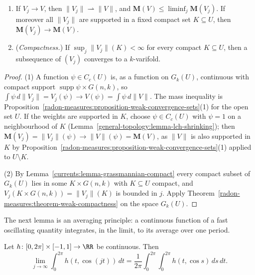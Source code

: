 \begin{proposition}\label{currents:proposition-varifold-convergence}
\begin{enumerate}
\item If $V_j \to V$, then $\|V_j\| \rightharpoonup \|V\|$, and $\mathbf{M}(V) \leq \liminf_j\mathbf{M}(V_j)$. If moreover all $\|V_j\|$ are supported in a fixed compact set $K \subseteq U$, then
$\mathbf{M}(V_j) \to \mathbf{M}(V)$.
\item (\emph{Compactness.}) If $\sup_j\|V_j\|(K) < \infty$ for every compact $K \subseteq U$, then a subsequence of $(V_j)$ converges to a $k$-varifold.
\end{enumerate}
\end{proposition}

\begin{proof}
(1) A function $\psi \in C_c(U)$ is, as a function on $G_k(U)$, continuous with compact support $\operatorname{supp}\psi \times G(n, k)$, so $\int\psi\,d\|V_j\| = V_j(\psi) \to V(\psi) = \int\psi\,d\|V\|$. The
mass inequality is Proposition~\ref{radon-measures:proposition-weak-convergence-sets}(1) for the open set $U$. If the weights are supported in $K$, choose $\psi \in C_c(U)$ with $\psi = 1$ on a neighbourhood
of $K$ (Lemma~\ref{general-topology:lemma-lch-shrinking}); then $\mathbf{M}(V_j) = \|V_j\|(\psi) \to \|V\|(\psi) = \mathbf{M}(V)$, as $\|V\|$ is also supported in $K$ by
Proposition~\ref{radon-measures:proposition-weak-convergence-sets}(1) applied to $U \setminus K$.

(2) By Lemma~\ref{currents:lemma-grassmannian-compact} every compact subset of $G_k(U)$ lies in some $K \times G(n, k)$ with $K \subseteq U$ compact, and $V_j(K \times G(n, k)) = \|V_j\|(K)$ is bounded in
$j$. Apply Theorem~\ref{radon-measures:theorem-weak-compactness} on the space $G_k(U)$.
\end{proof}

The next lemma is an averaging principle: a continuous function of a fast oscillating quantity integrates, in the limit, to its average over one period.

\begin{lemma}\label{currents:lemma-averaging}
Let $h \colon [0, 2\pi] \times [-1, 1] \to \RR$ be continuous. Then
\[
\lim_{j \to \infty}\int_0^{2\pi}h(t, \cos(jt))\,dt = \frac1{2\pi}\int_0^{2\pi}\int_0^{2\pi}h(t, \cos s)\,ds\,dt .
\]
\end{lemma}

